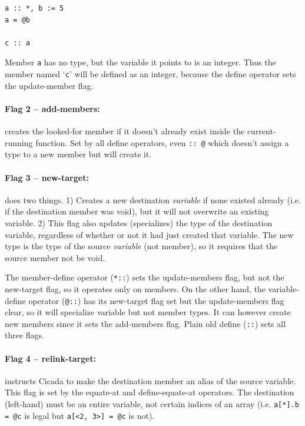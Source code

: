\documentclass{article}
\newenvironment{code}{
       \begin{list}{}{
               \setlength{\leftmargin}{.4in}
               \setlength{\rightmargin}{0in}
               \setlength{\topsep}{.2in}
       }
       \small
       \item[] }
       { \end{list}   }
\begin{document}
\begin{code} \begin{verbatim}
a :: *, b := 5
a = @b

c :: a
\end{verbatim} \end{code}

\noindent Member \verb#a# has no type, but the variable it points to is an integer.  Thus the member named `\verb#c#' will be defined as an integer, because the define operator sets the update-member flag.\\


\paragraph{Flag 2 -- add-members:}  creates the looked-for member if it doesn't already exist inside the current-running function.  Set by all define operators, even \verb#:: @# which doesn't assign a type to a new member but will create it.\\


\paragraph{Flag 3 -- new-target:}  does two things.  1) Creates a new destination \emph{variable} if none existed already (i.e. if the destination member was void), but it will not overwrite an existing variable.  2) This flag also updates (specializes) the type of the destination variable, regardless of whether or not it had just created that variable.  The new type is the type of the source \emph{variable} (not member), so it requires that the source member not be void.

The member-define operator (\verb#*::#) sets the update-members flag, but not the new-target flag, so it operates only on members.  On the other hand, the variable-define operator (\verb#@::#) has its new-target flag set but the update-members flag clear, so it will specialize variable but not member types.  It can however create new members since it sets the add-members flag.  Plain old define (\verb#::#) sets all three flags.\\


\paragraph{Flag 4 -- relink-target:}  instructs Cicada to make the destination member an alias of the source variable.  This flag is set by the equate-at and define-equate-at operators.  The destination (left-hand) must be an entire variable, not certain indices of an array (i.e. \verb#a[*].b = @c# is legal but \verb#a[<2, 3>] = @c# is not).
\end{document}
